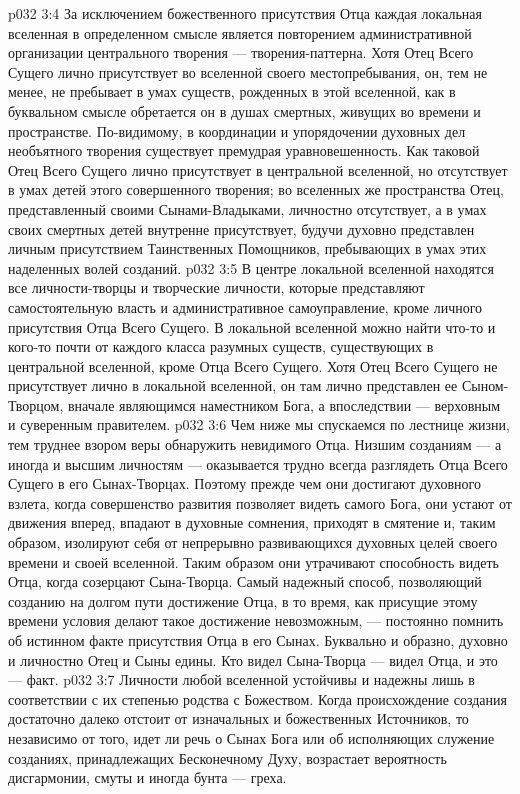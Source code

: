 \vs p032 3:4 \pc За исключением божественного присутствия Отца каждая локальная вселенная в определенном смысле является повторением административной организации центрального творения --- творения\hyp{}паттерна. Хотя Отец Всего Сущего лично присутствует во вселенной своего местопребывания, он, тем не менее, не пребывает в умах существ, рожденных в этой вселенной, как в буквальном смысле обретается он в душах смертных, живущих во времени и пространстве. По\hyp{}видимому, в координации и упорядочении духовных дел необъятного творения существует премудрая уравновешенность. Как таковой Отец Всего Сущего лично присутствует в центральной вселенной, но отсутствует в умах детей этого совершенного творения; во вселенных же пространства Отец, представленный своими Сынами\hyp{}Владыками, личностно отсутствует, а в умах своих смертных детей внутренне присутствует, будучи духовно представлен личным присутствием Таинственных Помощников, пребывающих в умах этих наделенных волей созданий.
\vs p032 3:5 В центре локальной вселенной находятся все личности\hyp{}творцы и творческие личности, которые представляют самостоятельную власть и административное самоуправление, кроме личного присутствия Отца Всего Сущего. В локальной вселенной можно найти что\hyp{}то и кого\hyp{}то почти от каждого класса разумных существ, существующих в центральной вселенной, кроме Отца Всего Сущего. Хотя Отец Всего Сущего не присутствует лично в локальной вселенной, он там лично представлен ее Сыном\hyp{}Творцом, вначале являющимся наместником Бога, а впоследствии --- верховным и суверенным правителем.
\vs p032 3:6 Чем ниже мы спускаемся по лестнице жизни, тем труднее взором веры обнаружить невидимого Отца. Низшим созданиям --- а иногда и высшим личностям --- оказывается трудно всегда разглядеть Отца Всего Сущего в его Сынах\hyp{}Творцах. Поэтому прежде чем они достигают духовного взлета, когда совершенство развития позволяет видеть самого Бога, они устают от движения вперед, впадают в духовные сомнения, приходят в смятение и, таким образом, изолируют себя от непрерывно развивающихся духовных целей своего времени и своей вселенной. Таким образом они утрачивают способность видеть Отца, когда созерцают Сына\hyp{}Творца. Самый надежный способ, позволяющий созданию на долгом пути достижение Отца, в то время, как присущие этому времени условия делают такое достижение невозможным, --- постоянно помнить об истинном факте присутствия Отца в его Сынах. Буквально и образно, духовно и личностно Отец и Сыны едины. Кто видел Сына\hyp{}Творца --- видел Отца, и это --- факт.
\vs p032 3:7 \pc Личности любой вселенной устойчивы и надежны лишь в соответствии с их степенью родства с Божеством. Когда происхождение создания достаточно далеко отстоит от изначальных и божественных Источников, то независимо от того, идет ли речь о Сынах Бога или об исполняющих служение созданиях, принадлежащих Бесконечному Духу, возрастает вероятность дисгармонии, смуты и иногда бунта --- греха.
